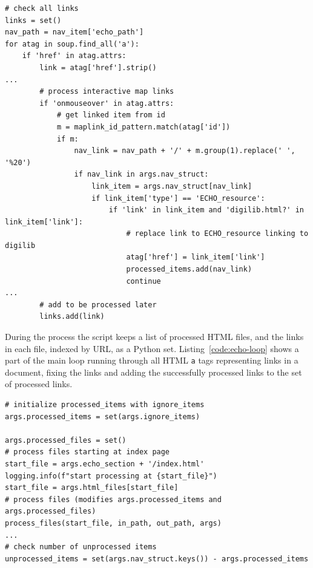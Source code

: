 \documentclass[final]{anthology-ch} %
\begin{document}
\begin{listing}
\begin{verbatim}
# check all links
links = set()
nav_path = nav_item['echo_path']
for atag in soup.find_all('a'):
    if 'href' in atag.attrs:
        link = atag['href'].strip()
...
        # process interactive map links
        if 'onmouseover' in atag.attrs:
            # get linked item from id
            m = maplink_id_pattern.match(atag['id'])
            if m:
                nav_link = nav_path + '/' + m.group(1).replace(' ', '%20')
                if nav_link in args.nav_struct:
                    link_item = args.nav_struct[nav_link]
                    if link_item['type'] == 'ECHO_resource':
                        if 'link' in link_item and 'digilib.html?' in link_item['link']:
                            # replace link to ECHO_resource linking to digilib
                            atag['href'] = link_item['link']
                            processed_items.add(nav_link)
                            continue
...                        
        # add to be processed later
        links.add(link)
\end{verbatim}
  \label{code:echo-loop}
\end{listing}

During the process the script keeps a list of processed HTML files, and the links in each file, indexed by URL, as a Python set. Listing~\ref{code:echo-loop} shows a part of the main loop running through all HTML \texttt{a} tags representing links in a document, fixing the links and adding the successfully processed links to the set of processed links.

\begin{listing}
\begin{verbatim}
# initialize processed_items with ignore_items
args.processed_items = set(args.ignore_items)

args.processed_files = set()
# process files starting at index page
start_file = args.echo_section + '/index.html'
logging.info(f"start processing at {start_file}")
start_file = args.html_files[start_file]
# process files (modifies args.processed_items and args.processed_files)
process_files(start_file, in_path, out_path, args)
...
# check number of unprocessed items
unprocessed_items = set(args.nav_struct.keys()) - args.processed_items
\end{verbatim}
  \label{code:echo-tracking}
\end{listing}
\end{document}
